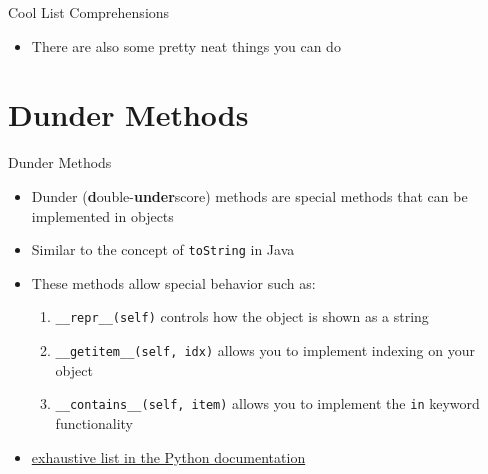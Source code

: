\documentclass[aspectratio=169,xcolor=dvipsnames]{beamer}
\begin{document}

\begin{frame}{Cool List Comprehensions}
  \begin{itemize}
    \item There are also some pretty neat things you can do
    \begin{example}
      
      
    \end{example}
  \end{itemize}
\end{frame}


\section{Dunder Methods}

\begin{frame}{Dunder Methods}
  \begin{itemize}
    \item Dunder (\textbf{d}ouble-\textbf{under}score) methods are special methods that can be implemented in objects
    \item Similar to the concept of \texttt{toString} in Java
    \item These methods allow special behavior such as:
      \begin{enumerate}
        \item \texttt{\_\_repr\_\_(self)} controls how the object is shown as a string
        \item \texttt{\_\_getitem\_\_(self, idx)} allows you to implement indexing on your object
        \item \texttt{\_\_contains\_\_(self, item)} allows you to implement the \texttt{in} keyword functionality
      \end{enumerate}
    \item \href{https://docs.python.org/3/reference/datamodel.html\#special-methods}{exhaustive list in the Python documentation}
  \end{itemize}
\end{frame}

\end{document}
